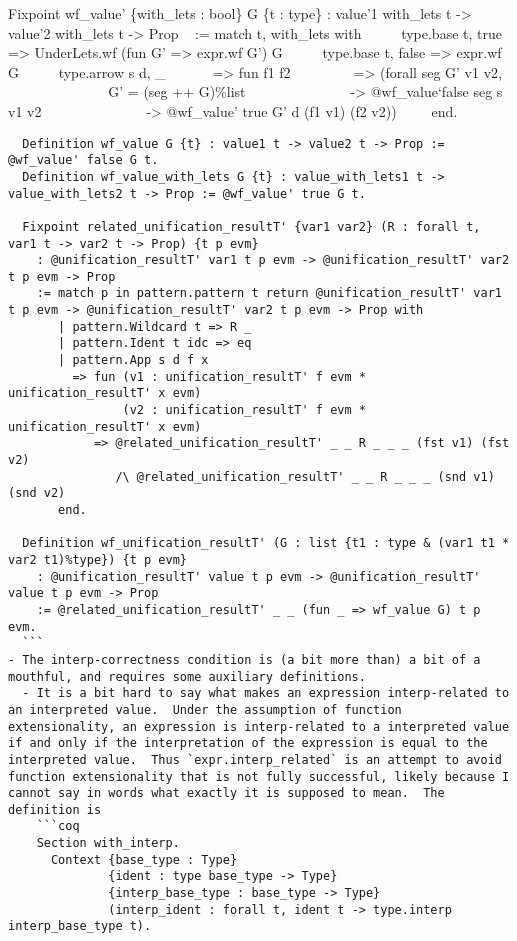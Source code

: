 \begin{itemize}
  Fixpoint wf\_value' \{with\_lets : bool\} G \{t : type\} : value'1
  with\_lets t -\textgreater{} value'2 with\_lets t -\textgreater{} Prop
  ~ := match t, with\_lets with ~ ~ ~\textbar{} type.base t, true
  =\textgreater{} UnderLets.wf (fun G' =\textgreater{} expr.wf G') G ~ ~
  ~\textbar{} type.base t, false =\textgreater{} expr.wf G ~ ~
  ~\textbar{} type.arrow s d, \_ ~ ~ ~ ~=\textgreater{} fun f1 f2 ~ ~ ~
  ~ ~ =\textgreater{} (forall seg G' v1 v2, ~ ~ ~ ~ ~ ~ ~ ~ ~G' = (seg
  ++ G)\%list ~ ~ ~ ~ ~ ~ ~ ~ ~-\textgreater{} @wf\_value`false seg s v1
  v2 ~ ~ ~ ~ ~ ~ ~ ~ ~-\textgreater{} @wf\_value' true G' d (f1 v1) (f2
  v2)) ~ ~ ~end.

\begin{verbatim}
  Definition wf_value G {t} : value1 t -> value2 t -> Prop := @wf_value' false G t.
  Definition wf_value_with_lets G {t} : value_with_lets1 t -> value_with_lets2 t -> Prop := @wf_value' true G t.

  Fixpoint related_unification_resultT' {var1 var2} (R : forall t, var1 t -> var2 t -> Prop) {t p evm}
    : @unification_resultT' var1 t p evm -> @unification_resultT' var2 t p evm -> Prop
    := match p in pattern.pattern t return @unification_resultT' var1 t p evm -> @unification_resultT' var2 t p evm -> Prop with
       | pattern.Wildcard t => R _
       | pattern.Ident t idc => eq
       | pattern.App s d f x
         => fun (v1 : unification_resultT' f evm * unification_resultT' x evm)
                (v2 : unification_resultT' f evm * unification_resultT' x evm)
            => @related_unification_resultT' _ _ R _ _ _ (fst v1) (fst v2)
               /\ @related_unification_resultT' _ _ R _ _ _ (snd v1) (snd v2)
       end.

  Definition wf_unification_resultT' (G : list {t1 : type & (var1 t1 * var2 t1)%type}) {t p evm}
    : @unification_resultT' value t p evm -> @unification_resultT' value t p evm -> Prop
    := @related_unification_resultT' _ _ (fun _ => wf_value G) t p evm.
  ```
- The interp-correctness condition is (a bit more than) a bit of a mouthful, and requires some auxiliary definitions.
  - It is a bit hard to say what makes an expression interp-related to an interpreted value.  Under the assumption of function extensionality, an expression is interp-related to a interpreted value if and only if the interpretation of the expression is equal to the interpreted value.  Thus `expr.interp_related` is an attempt to avoid function extensionality that is not fully successful, likely because I cannot say in words what exactly it is supposed to mean.  The definition is
    ```coq
    Section with_interp.
      Context {base_type : Type}
              {ident : type base_type -> Type}
              {interp_base_type : base_type -> Type}
              (interp_ident : forall t, ident t -> type.interp interp_base_type t).


\end{verbatim}
\end{itemize}
